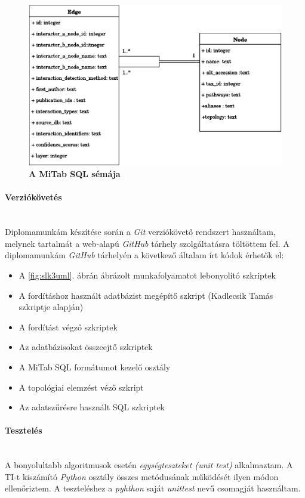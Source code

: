\documentclass[a4paper,12pt]{article}
\begin{document}
				\begin{figure}[H]
					 \includegraphics[scale=0.7]{img/Mitab-SQL.pdf}
			 		 \centering
			 		 \caption{ \textbf{A MiTab SQL sémája} }
			 		 \label{fig:mitab_scheme}
				\end{figure}

			\paragraph{Verziókövetés} \mbox{}\\
			Diplomamunkám készítése során a \textit{Git} verziókövető rendszert használtam, melynek tartalmát a web-alapú \textit{GitHub} tárhely szolgáltatásra töltöttem fel. A diplomamunkám \textit{GitHub} tárhelyén \cite{github} a következő általam írt kódok érhetők el:
				\begin{itemize}
						\item A \ref{fig:slk3uml}. ábrán ábrázolt munkafolyamatot lebonyolító szkriptek
						\item A fordításhoz használt adatbázist megépítő szkript (Kadlecsik Tamás szkriptje alapján)
						\item A fordítást végző szkriptek
						\item Az adatbázisokat összeejtő szkriptek
						\item A MiTab SQL formátumot kezelő osztály
						\item A topológiai elemzést véző szkript
						\item Az adatszűrésre használt SQL szkriptek
				\end{itemize}

			\paragraph{Tesztelés} \mbox{}\\
			A bonyolultabb algoritmusok esetén \textit{egységteszteket (unit test)} alkalmaztam. A TI-t kiszámító \textit{Python} osztály összes metódusának működését ilyen módon ellenőriztem. A teszteléshez a \textit{pyhthon} saját \textit{unittest} nevű csomagját használtam.
\end{document}
